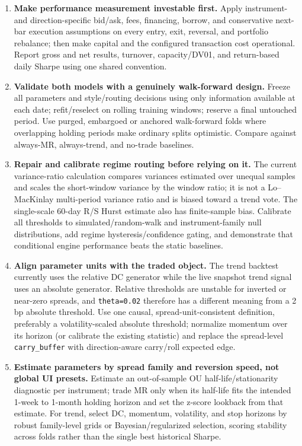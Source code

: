 \begin{enumerate}
\item \textbf{Make performance measurement investable first.} Apply instrument- and
direction-specific bid/ask, fees, financing, borrow, and conservative next-bar
execution assumptions on every entry, exit, reversal, and portfolio rebalance;
then make capital and the configured transaction cost operational. Report gross
and net results, turnover, capacity/DV01, and return-based daily Sharpe using one
shared convention.

\item \textbf{Validate both models with a genuinely walk-forward design.} Freeze all
parameters and style/routing decisions using only information available at each
date; refit/reselect on rolling training windows; reserve a final untouched period.
Use purged, embargoed or anchored walk-forward folds where overlapping holding
periods make ordinary splits optimistic. Compare against always-MR, always-trend,
and no-trade baselines.

\item \textbf{Repair and calibrate regime routing before relying on it.} The current
variance-ratio calculation compares variances estimated over unequal samples and
scales the short-window variance by the window ratio; it is not a Lo--MacKinlay
multi-period variance ratio and is biased toward a trend vote. The single-scale
60-day R/S Hurst estimate also has finite-sample bias. Calibrate all thresholds to
simulated/random-walk and instrument-family null distributions, add regime
hysteresis/confidence gating, and demonstrate that conditional engine performance
beats the static baselines.

\item \textbf{Align parameter units with the traded object.} The trend backtest currently
uses the relative DC generator while the live snapshot trend signal uses an
absolute generator. Relative thresholds are unstable for inverted or near-zero
spreads, and \texttt{theta=0.02} therefore has a different meaning from a 2 bp absolute
threshold. Use one causal, spread-unit-consistent definition, preferably a
volatility-scaled absolute threshold; normalize momentum over its horizon (or
calibrate the existing statistic) and replace the spread-level \texttt{carry\_buffer} with
direction-aware carry/roll expected edge.

\item \textbf{Estimate parameters by spread family and reversion speed, not global UI
presets.} Estimate an out-of-sample OU half-life/stationarity diagnostic per
instrument; trade MR only when its half-life fits the intended 1-week to 1-month
holding horizon and set the z-score lookback from that estimate. For trend, select
DC, momentum, volatility, and stop horizons by robust family-level grids or
Bayesian/regularized selection, scoring stability across folds rather than the
single best historical Sharpe.


\end{enumerate}
